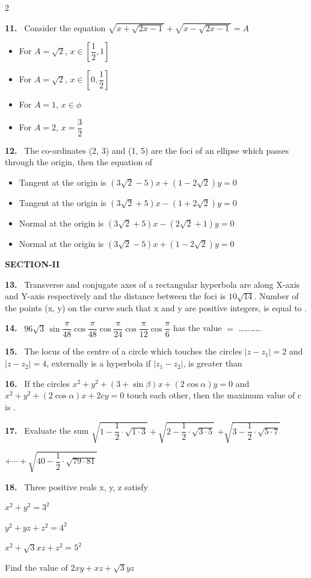 \documentclass[10pt]{extarticle}
\newcommand{\sect}[1]{\par\smallskip\noindent\textbf{#1}\par}
\newcommand{\qn}[1]{\par\smallskip\noindent\textbf{#1.}~}
\newenvironment{qoptions}{\begin{itemize}[leftmargin=1.8em,itemsep=1pt,topsep=2pt,label={}]}{\end{itemize}}
\newcommand{\opt}[2]{\item[(#1)] #2}
\begin{document}
\begin{multicols}{2}
\qn{11} Consider the equation $\sqrt{x+\sqrt{2x-1}}+\sqrt{x-\sqrt{2x-1}}=A$
\begin{qoptions}
\opt{A}{For $A=\sqrt2$, $x\in\left[\dfrac12,1\right]$}
\opt{B}{For $A=\sqrt2$, $x\in\left[0,\dfrac12\right]$}
\opt{C}{For $A=1$, $x\in\phi$}
\opt{D}{For $A=2$, $x=\dfrac32$}
\end{qoptions}
\qn{12} The co-ordinates (2, 3) and (1, 5) are the foci of an ellipse which passes through the origin, then the equation of
\begin{qoptions}
\opt{A}{Tangent at the origin is $(3\sqrt2-5)x+(1-2\sqrt2)y=0$}
\opt{B}{Tangent at the origin is $(3\sqrt2+5)x-(1+2\sqrt2)y=0$}
\opt{C}{Normal at the origin is $(3\sqrt2+5)x-(2\sqrt2+1)y=0$}
\opt{D}{Normal at the origin is $(3\sqrt2-5)x+(1-2\sqrt2)y=0$}
\end{qoptions}
\sect{SECTION-II}
\qn{13} Transverse and conjugate axes of a rectangular hyperbola are along X-axis and Y-axis respectively and the distance between the foci is $10\sqrt{14}$. Number of the points (x, y) on the curve such that x and y are positive integers, is equal to \underline{\hspace{1cm}}.
\qn{14} $96\sqrt3\,\sin\dfrac\pi{48}\cos\dfrac\pi{48}\cos\dfrac\pi{24}\cos\dfrac\pi{12}\cos\dfrac\pi6$ has the value $=$ \ldots\ldots\ldots\ldots
\qn{15} The locus of the centre of a circle which touches the circles $|z-z_1|=2$ and $|z-z_2|=4$, externally is a hyperbola if $|z_1-z_2|$, is greater than \underline{\hspace{1cm}}
\qn{16} If the circles $x^2+y^2+(3+\sin\beta)x+(2\cos\alpha)y=0$ and $x^2+y^2+(2\cos\alpha)x+2cy=0$ touch each other, then the maximum value of c is \underline{\hspace{1cm}}.
\qn{17} Evaluate the sum $\sqrt{1-\dfrac12\cdot\sqrt{1\cdot3}}+\sqrt{2-\dfrac12\cdot\sqrt{3\cdot5}}$ $+\sqrt{3-\dfrac12\cdot\sqrt{5\cdot7}}$\par $+\cdots+\sqrt{40-\dfrac12\cdot\sqrt{79\cdot81}}$
\qn{18} Three positive reals x, y, z satisfy\par
$x^2+y^2=3^2$\par
$y^2+yz+z^2=4^2$\par
$x^2+\sqrt3xz+z^2=5^2$\par
Find the value of $2xy+xz+\sqrt3yz$
\end{multicols}
\end{document}
